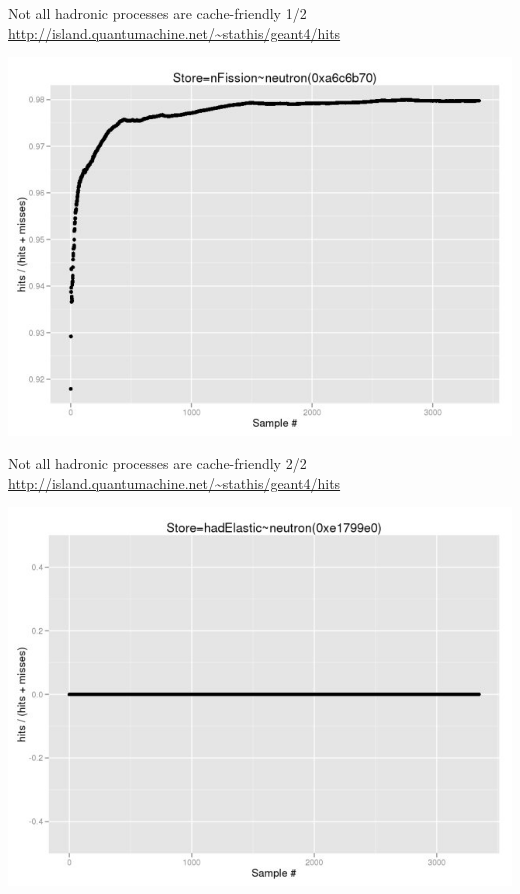 \documentclass{beamer}
\begin{document}
\begin{frame}{Not all hadronic processes are cache-friendly 1/2}
\url {http://island.quantumachine.net/~stathis/geant4/hits}
\begin{center}
	\includegraphics[width=1.0\textwidth]{002-2hits.png.medium.jpeg}
\end{center}
\end{frame}

\begin{frame}{Not all hadronic processes are cache-friendly 2/2}
\url {http://island.quantumachine.net/~stathis/geant4/hits}
\begin{center}
	\includegraphics[width=1.0\textwidth]{003-3hits.png.medium.jpeg}
\end{center}
\end{frame}
\end{document}
